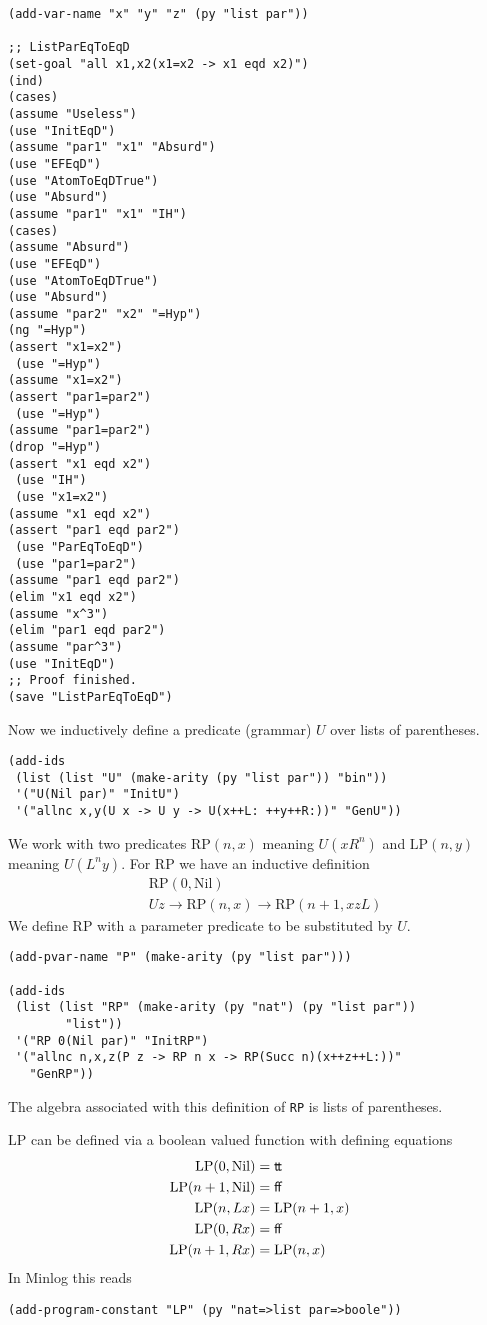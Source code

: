 \documentclass[12pt]{amsart}
\newcommand{\nil}{\mathrm{Nil}}
\newcommand{\false}{\mathsf{f\kern-0.14em f}}
\newcommand{\true}{\mathsf{t\kern-0.14em t}}
\begin{document}
\begin{appendix}
\begin{verbatim}
(add-var-name "x" "y" "z" (py "list par"))

;; ListParEqToEqD
(set-goal "all x1,x2(x1=x2 -> x1 eqd x2)")
(ind)
(cases)
(assume "Useless")
(use "InitEqD")
(assume "par1" "x1" "Absurd")
(use "EFEqD")
(use "AtomToEqDTrue")
(use "Absurd")
(assume "par1" "x1" "IH")
(cases)
(assume "Absurd")
(use "EFEqD")
(use "AtomToEqDTrue")
(use "Absurd")
(assume "par2" "x2" "=Hyp")
(ng "=Hyp")
(assert "x1=x2")
 (use "=Hyp")
(assume "x1=x2")
(assert "par1=par2")
 (use "=Hyp")
(assume "par1=par2")
(drop "=Hyp")
(assert "x1 eqd x2")
 (use "IH")
 (use "x1=x2")
(assume "x1 eqd x2")
(assert "par1 eqd par2")
 (use "ParEqToEqD")
 (use "par1=par2")
(assume "par1 eqd par2")
(elim "x1 eqd x2")
(assume "x^3")
(elim "par1 eqd par2")
(assume "par^3")
(use "InitEqD")
;; Proof finished.
(save "ListParEqToEqD")
\end{verbatim}

Now we inductively define a predicate (grammar) $U$ over lists of
parentheses.
\begin{verbatim}
(add-ids
 (list (list "U" (make-arity (py "list par")) "bin"))
 '("U(Nil par)" "InitU")
 '("allnc x,y(U x -> U y -> U(x++L: ++y++R:))" "GenU"))
\end{verbatim}
We work with two predicates $\mathrm{RP}(n,x)$ meaning $U(x R^n)$ and
$\mathrm{LP}(n,y)$ meaning $U(L^n y)$.  For $\mathrm{RP}$ we have an
inductive definition
\begin{align*}
  & \mathrm{RP}(0,\nil)
  \\
  & U z \to \mathrm{RP}(n,x) \to \mathrm{RP}(n+1,xzL)
\end{align*}
We define $\mathrm{RP}$ with a parameter predicate to be substituted
by $U$.
\begin{verbatim}
(add-pvar-name "P" (make-arity (py "list par")))

(add-ids
 (list (list "RP" (make-arity (py "nat") (py "list par"))
        "list"))
 '("RP 0(Nil par)" "InitRP")
 '("allnc n,x,z(P z -> RP n x -> RP(Succ n)(x++z++L:))"
   "GenRP"))
\end{verbatim}
The algebra associated with this definition of \verb|RP| is lists of
parentheses.

$\mathrm{LP}$ can be defined via a boolean valued function with
defining equations
\begin{align*}
  \mathrm{LP}(0,\nil) &= \true
  \\
  \mathrm{LP}(n+1,\nil) &= \false
  \\
  \mathrm{LP}(n,Lx) &= \mathrm{LP}(n+1,x)
  \\
  \mathrm{LP}(0,Rx) &= \false
  \\
  \mathrm{LP}(n+1,Rx) &= \mathrm{LP}(n,x)
\end{align*}
In Minlog this reads
\begin{verbatim}
(add-program-constant "LP" (py "nat=>list par=>boole"))


\end{verbatim}
\end{appendix}
\end{document}
